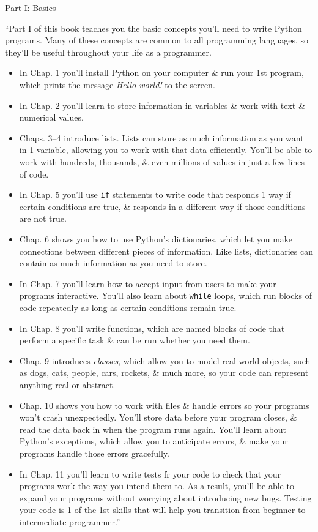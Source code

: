 \documentclass[oneside]{book}
\numberwithin{equation}{section}
\begin{document}
\begin{center}
	\huge Part I: Basics
\end{center}
``Part I of this book teaches you the basic concepts you'll need to write Python programs. Many of these concepts are common to all programming languages, so they'll be useful throughout your life as a programmer.
\begin{itemize}
	\item In Chap. 1 you'll install Python on your computer \& run your 1st program, which prints the message \textit{Hello world!} to the screen.
	\item In Chap. 2 you'll learn to store information in variables \& work with text \& numerical values.
	\item Chaps. 3--4 introduce lists. Lists can store as much information as you want in 1 variable, allowing you to work with that data efficiently. You'll be able to work with hundreds, thousands, \& even millions of values in just a few lines of code.
	\item In Chap. 5 you'll use \texttt{if} statements to write code that responds 1 way if certain conditions are true, \& responds in a different way if those conditions are not true.
	\item Chap. 6 shows you how to use Python's dictionaries, which let you make connections between different pieces of information. Like lists, dictionaries can contain as much information as you need to store.
	\item In Chap. 7 you'll learn how to accept input from users to make your programs interactive. You'll also learn about \texttt{while} loops, which run blocks of code repeatedly as long as certain conditions remain true.
	\item In Chap. 8 you'll write functions, which are named blocks of code that perform a specific task \& can be run whether you need them.
	\item Chap. 9 introduces \textit{classes}, which allow you to model real-world objects, such as dogs, cats, people, cars, rockets, \& much more, so your code can represent anything real or abstract.
	\item Chap. 10 shows you how to work with files \& handle errors so your programs won't crash unexpectedly. You'll store data before your program closes, \& read the data back in when the program runs again. You'll learn about Python's exceptions, which allow you to anticipate errors, \& make your programs handle those errors gracefully.
	\item In Chap. 11 you'll learn to write tests fr your code to check that your programs work the way you intend them to. As a result, you'll be able to expand your programs without worrying about introducing new bugs. Testing your code is 1 of the 1st skills that will help you transition from beginner to intermediate programmer.'' -- \cite[pp. 1--2]{Matthes2019}
\end{itemize}
\end{document}
